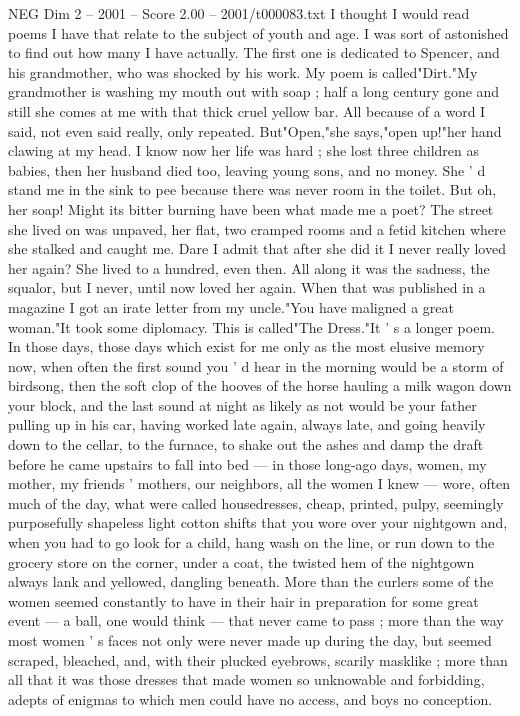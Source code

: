 \begin{textsample}{NEG Dim 2 – 2001 – Score 2.00 – 2001/t000083.txt}  \label{ex:f2_neg_056}
I thought I would read poems I have that relate to the subject of youth and age.
I was sort of astonished to find out how many I have actually.
The first one is dedicated to Spencer, and his grandmother, who was shocked by his work.
My poem is called"Dirt."My grandmother is washing my mouth out with soap ; half a long century gone and still she comes at me with that thick cruel yellow bar.
All because of a word I said, not even said really, only repeated.
But"Open,"she says,"open up!"her hand clawing at my head.
I know now her life was hard ; she lost three children as babies, then her husband died too, leaving young sons, and no money.
She ' d stand me in the sink to pee because there was never room in the toilet.
But oh, her soap!
Might its bitter burning have been what made me a poet?
The street she lived on was unpaved, her flat, two cramped rooms and a fetid kitchen where she stalked and caught me.
Dare I admit that after she did it I never really loved her again?
She lived to a hundred, even then.
All along it was the sadness, the squalor, but I never, until now loved her again.
When that was published in a magazine I got an irate letter from my uncle."You have maligned a great woman."It took some diplomacy.
This is called"The Dress."It ' s a longer poem.
In those days, those days which exist for me only as the most elusive memory now, when often the first sound you ' d hear in the morning would be a storm of birdsong, then the soft clop of the hooves of the horse hauling a milk wagon down your block, and the last sound at night as likely as not would be your father pulling up in his car, having worked late again, always late, and going heavily down to the cellar, to the furnace, to shake out the ashes and damp the draft before he came upstairs to fall into bed — in those long-ago days, women, my mother, my friends ' mothers, our neighbors, all the women I knew — wore, often much of the day, what were called housedresses, cheap, printed, pulpy, seemingly purposefully shapeless light cotton shifts that you wore over your nightgown and, when you had to go look for a child, hang wash on the line, or run down to the grocery store on the corner, under a coat, the twisted hem of the nightgown always lank and yellowed, dangling beneath.
More than the curlers some of the women seemed constantly to have in their hair in preparation for some great event — a ball, one would think — that never came to pass ; more than the way most women ' s faces not only were never made up during the day, but seemed scraped, bleached, and, with their plucked eyebrows, scarily masklike ; more than all that it was those dresses that made women so unknowable and forbidding, adepts of enigmas to which men could have no access, and boys no conception.

\end{textsample}
